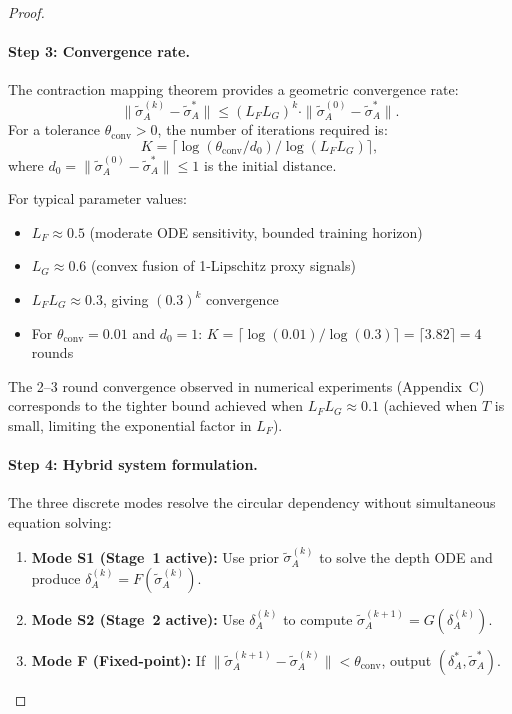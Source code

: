 \begin{proof}
\paragraph{Step 3: Convergence rate.}
The contraction mapping theorem provides a geometric convergence rate:
\[
\|\tilde{\sigma}_A^{(k)} - \tilde{\sigma}_A^*\|
\leq (L_F L_G)^k \cdot \|\tilde{\sigma}_A^{(0)} - \tilde{\sigma}_A^*\|.
\]
For a tolerance $\theta_{\text{conv}} > 0$, the number of iterations
required is:
\[
K = \lceil \log(\theta_{\text{conv}} / d_0) / \log(L_F L_G) \rceil,
\]
where $d_0 = \|\tilde{\sigma}_A^{(0)} - \tilde{\sigma}_A^*\| \leq 1$
is the initial distance.

For typical parameter values:
\begin{itemize}[nosep]
\item $L_F \approx 0.5$ (moderate ODE sensitivity, bounded training horizon)
\item $L_G \approx 0.6$ (convex fusion of 1-Lipschitz proxy signals)
\item $L_F L_G \approx 0.3$, giving $(0.3)^k$ convergence
\item For $\theta_{\text{conv}} = 0.01$ and $d_0 = 1$: $K = \lceil \log(0.01) / \log(0.3) \rceil = \lceil 3.82 \rceil = 4$ rounds
\end{itemize}
The 2--3 round convergence observed in numerical experiments
(Appendix~C) corresponds to the tighter bound achieved when
$L_F L_G \approx 0.1$ (achieved when $T$ is small, limiting the
exponential factor in $L_F$).

\paragraph{Step 4: Hybrid system formulation.}
The three discrete modes resolve the circular dependency without
simultaneous equation solving:

\begin{enumerate}[nosep]
\item \textbf{Mode S1 (Stage~1 active):} Use prior $\tilde{\sigma}_A^{(k)}$
  to solve the depth ODE and produce $\delta_A^{(k)} = F(\tilde{\sigma}_A^{(k)})$.
\item \textbf{Mode S2 (Stage~2 active):} Use $\delta_A^{(k)}$ to compute
  $\tilde{\sigma}_A^{(k+1)} = G(\delta_A^{(k)})$.
\item \textbf{Mode F (Fixed-point):} If
  $\|\tilde{\sigma}_A^{(k+1)} - \tilde{\sigma}_A^{(k)}\| < \theta_{\text{conv}}$,
  output $(\delta_A^*, \tilde{\sigma}_A^*)$.
\end{enumerate}


\end{proof}
